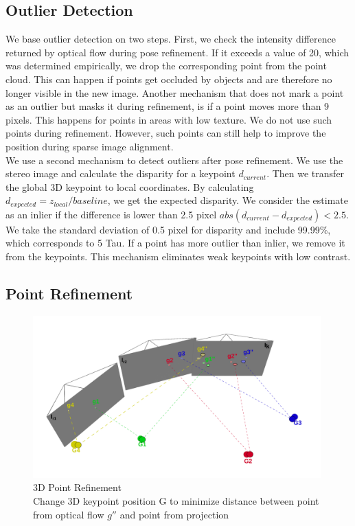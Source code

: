 \documentclass[11pt,a4paper,titlepage,oneside]{report}
\begin{document}
\subsection{Outlier Detection}
We base outlier detection on two steps. First, we check the intensity difference returned by optical flow during pose refinement. If it exceeds a value of 20, which was determined empirically, we drop the corresponding point from the point cloud. This can happen if points get occluded by objects and are therefore no longer visible in the new image. Another mechanism that does not mark a point as an outlier but masks it during refinement, is if a point moves more than 9 pixels. This happens for points in areas with low texture. We do not use such points during refinement. However, such points can still help to improve the position during sparse image alignment.\\
We use a second mechanism to detect outliers after pose refinement. We use the stereo image and calculate the disparity for a keypoint $d_{current}$. Then we transfer the global 3D keypoint to local coordinates. By calculating $d_{expected}=z_{local}/baseline$, we get the expected disparity. We consider the estimate as an inlier if the difference is lower than 2.5 pixel $abs(d_{current}-d_{expected})<2.5$. We take the standard deviation of 0.5 pixel for disparity and include 99.99\%, which corresponds to 5 Tau. If a point has more outlier than inlier, we remove it from the keypoints. This mechanism eliminates weak keypoints with low contrast.

\subsection{Point Refinement}
\begin{figure}[H]
  \centering
  \includegraphics[width=0.99\textwidth]{img/pose_estimation_point_update.png}
  \caption{3D Point Refinement\\
  Change 3D keypoint position G to minimize distance between point from optical flow $g''$ and point from projection}
  \label{fig:point_update}
\end{figure}
\end{document}
